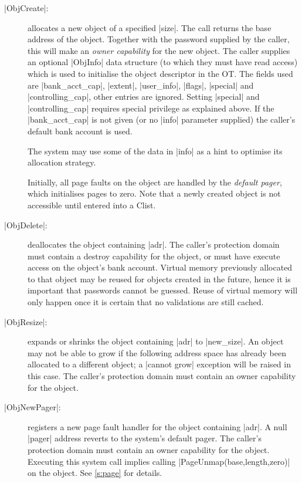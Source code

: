 \documentclass[a4paper,11pt,twoside,dvips]{report}
\begin{document}
\begin{description}
\item[|ObjCreate|:] allocates a new object of a specified |size|. The
call returns the base address of the object. Together with the
password supplied by the caller, this will make an \emph{owner
capability} for the new object. The caller supplies an optional
|ObjInfo| data structure (to which they must have read access) which is
used to initialise the object
descriptor in the OT. The fields used are |bank\_acct\_cap|, |extent|,
|user\_info|, |flags|, |special| and |controlling\_cap|, other entries
are ignored. Setting |special| and |controlling\_cap| requires special
privilege as explained above. If the |bank\_acct\_cap| is not given (or
no |info| parameter supplied) the caller's default bank account is
used.

The system may use some of the data in |info| as a hint to optimise its
allocation strategy.

Initially, all page faults on the object are handled by the
\emph{default pager}, which initialises pages to zero. Note that a newly
created object is not accessible until entered into a Clist.

\item[|ObjDelete|:] deallocates the object containing |adr|. The
caller's protection domain must contain a destroy capability for the
object, or must have execute access on the object's bank account. Virtual
memory previously allocated to that object may be reused for objects
created in the future, hence it is important that passwords cannot be
guessed.  Reuse of virtual memory will only happen once it is certain
that no validations are still cached.

\item[|ObjResize|:] expands or shrinks the object containing |adr| to
|new\_size|. An object may not be able to grow if the following address
space has already been allocated to a different object; a |cannot grow|
exception will be raised in this case. The caller's protection domain
must contain an owner capability for the object.

\item[|ObjNewPager|:] registers a new page fault handler for the object
containing |adr|. A null |pager| address reverts to the system's default
pager. The caller's protection domain must contain an owner capability
for the object. Executing this system call implies calling
|PageUnmap(base,length,zero)| on the object. See \autoref{s:page} for
details.


\end{description}
\end{document}
